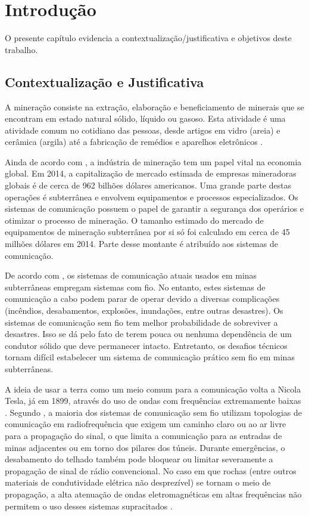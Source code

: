 \chapter[Introdução]{Introdução}

O presente capítulo evidencia a contextualização/justificativa e objetivos deste trabalho.

\section{Contextualização e Justificativa}

A mineração consiste na extração, elaboração e beneficiamento de minerais que se encontram em estado natural sólido, líquido ou gasoso. Esta atividade é uma atividade comum no cotidiano das pessoas, desde artigos em vidro (areia) e cerâmica (argila) até a fabricação de remédios e aparelhos eletrônicos \cite{forooshani2013survey}.

Ainda de acordo com \cite{forooshani2013survey}, a indústria de mineração tem um papel vital na economia global. Em 2014, a capitalização de mercado estimada de empresas mineradoras globais é de cerca de 962 bilhões dólares americanos. Uma grande parte destas operações é subterrânea e envolvem equipamentos e processos especializados. Os sistemas de comunicação possuem o papel de garantir a segurança dos operários e otimizar o processo de mineração. O tamanho estimado do mercado de equipamentos de mineração subterrânea por si só foi calculado em cerca de 45 milhões dólares em 2014. Parte desse montante é atribuído aos sistemas de comunicação.


De acordo com \cite{barkand2006through}, os sistemas de comunicação atuais usados em minas subterrâneas empregam sistemas com fio. No entanto, estes sistemas de comunicação a cabo podem parar de operar devido a diversas complicações (incêndios, desabamentos, explosões, inundações, entre outras desastres). Os sistemas de comunicação sem fio tem melhor probabilidade de sobreviver a desastres. Isso se dá pelo fato de terem pouca ou nenhuma dependência de um condutor sólido que deve permanecer intacto. Entretanto, os desafios técnicos tornam difícil estabelecer um sistema de comunicação prático sem fio em minas subterrâneas.

A ideia de usar a terra como um meio comum para a comunicação volta a Nicola Tesla, já em 1899, através do uso de ondas com frequências extremamente baixas \cite{wheeler1961radio}. Segundo \cite{barkand2006through}, a maioria dos sistemas de comunicação sem fio utilizam topologias de comunicação em radiofrequência que exigem um caminho claro ou ao ar livre para a propagação do sinal, o que limita a comunicação para as entradas de minas adjacentes ou em torno dos pilares dos túneis. Durante emergências, o desabamento do telhado também pode bloquear ou limitar severamente a propagação de sinal de rádio convencional. No caso em que rochas (entre outros materiais de condutividade elétrica não desprezível) se tornam o meio de propagação, a alta atenuação de ondas eletromagnéticas em altas frequências não permitem o uso desses sistemas supracitados \cite{raab1995signal}.

